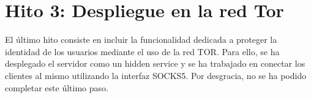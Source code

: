 \section{Hito 3: Despliegue en la red Tor}

El último hito consiste en incluir la funcionalidad dedicada a proteger la identidad de los usuarios mediante el uso de la red TOR. Para ello, se ha desplegado el servidor como un hidden service y se ha trabajado en conectar los clientes al mismo utilizando la interfaz SOCKS5. Por desgracia, no se ha podido completar este último paso. \\ 




